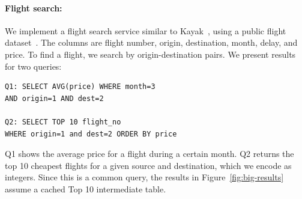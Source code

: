 
\paragraph{Flight search:}
We implement a flight search service similar to Kayak~\cite{kayak}, using 
a public flight dataset~\cite{enigma}. The columns
are flight number, origin, destination, month, delay, and price. To find a flight,
we search by origin-destination pairs. 
We present results for two queries:

\begin{verbatim}
Q1: SELECT AVG(price) WHERE month=3 
AND origin=1 AND dest=2

Q2: SELECT TOP 10 flight_no
WHERE origin=1 and dest=2 ORDER BY price
\end{verbatim}

Q1 shows the average price for a flight during a certain month.
Q2 returns the top 10 cheapest flights for a given source and destination, which 
we encode as integers.
Since this is a common query, the results in Figure~\ref{fig:big-results} 
assume a cached Top 10 intermediate table. 

